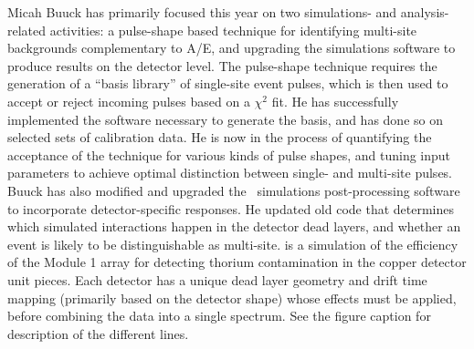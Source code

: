 Micah Buuck has primarily focused this year on two simulations- and analysis-related activities: a pulse-shape based technique for identifying multi-site backgrounds complementary to A/E, and upgrading the simulations software to produce results on the detector level.\newline
\indent The pulse-shape technique requires the generation of a ``basis library'' of single-site event pulses, which is then used to accept or reject incoming pulses based on a $\chi^2$ fit. He has successfully implemented the software necessary to generate the basis, and has done so on selected sets of calibration data. He is now in the process of quantifying the acceptance of the technique for various kinds of pulse shapes, and tuning input parameters to achieve optimal distinction between single- and multi-site pulses.\newline
\indent Buuck has also modified and upgraded the \MJ\ simulations post-processing software to incorporate detector-specific responses. He updated old code that determines which simulated interactions happen in the detector dead layers, and whether an event is likely to be distinguishable as multi-site.  is a simulation of the efficiency of the Module 1 array for detecting thorium contamination in the copper detector unit pieces. Each detector has a unique dead layer geometry and drift time mapping (primarily based on the detector shape) whose effects must be applied, before combining the data into a single spectrum. See the figure caption for description of the different lines.

